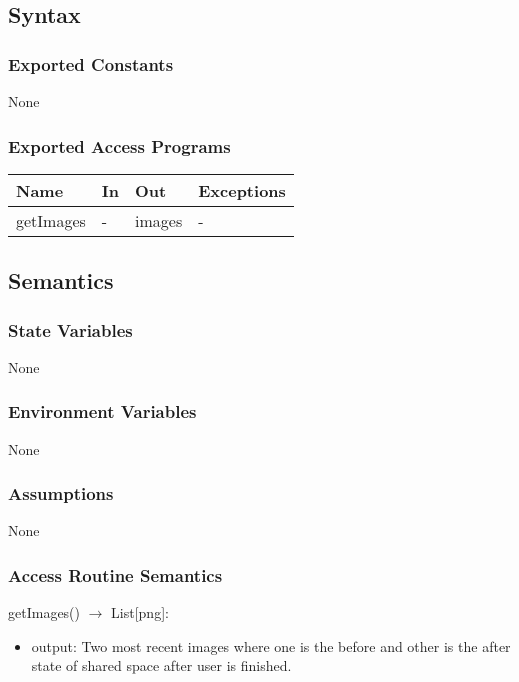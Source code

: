 \documentclass[12pt, titlepage]{article}
\begin{document}
\subsection{Syntax}

\subsubsection{Exported Constants}
None

\subsubsection{Exported Access Programs}

\begin{center}
\begin{tabular}{p{4cm} p{4cm} p{4cm} p{3.5cm}}
\hline
\textbf{Name} & \textbf{In} & \textbf{Out} & \textbf{Exceptions} \\
\hline
getImages & - & images & - \\
\hline
\end{tabular}
\end{center}

\subsection{Semantics}

\subsubsection{State Variables}
None

\subsubsection{Environment Variables}
None

\subsubsection{Assumptions}
None

\subsubsection{Access Routine Semantics}

\noindent getImages() $\rightarrow$ List[png]:
\begin{itemize}
\item output: Two most recent images where one is the before and other is the after state of shared space after user is finished.
\end{itemize}
\end{document}
